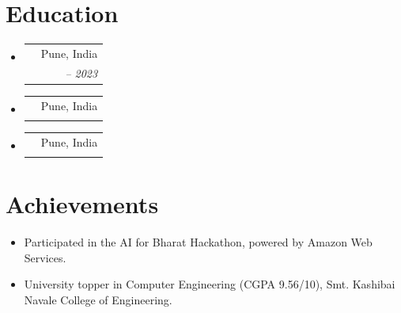 \documentclass[a4paper]{article}
\makeatletter
\newcommand{\garamondmedium}{\fontfamily{EBGaramond-LF}\fontseries{medium}\selectfont}
\newcommand{\body}{\fontsize{9.4pt}{12.6pt}\selectfont}
\newcommand{\meta}{\fontsize{9.4pt}{12.2pt}\selectfont}
\newcommand{\primary}{\fontsize{10.15pt}{12.4pt}\selectfont}
\newcommand{\rolefont}{\garamondmedium\itshape\fontsize{9.75pt}{12pt}\selectfont}
\newcommand{\resumeItem}[1]{\item\body #1}
\newcommand{\resumeSubheading}[4]{%
  \item
  \begin{tabular*}{\textwidth}[t]{@{}>{\RaggedRight\arraybackslash}p{\dimexpr\textwidth-1.85in\relax}@{\extracolsep{\fill}}r@{}}
    {\primary\textbf{#1}} & {\meta #2} \\[-0.5pt]
    {\rolefont #3} & {\rolefont #4} \\
  \end{tabular*}%
}
\newcommand{\resumeSubHeadingListStart}{\begin{itemize}[leftmargin=0in, label={}, topsep=1.5pt, partopsep=0pt, itemsep=5pt, parsep=0pt]}
\newcommand{\resumeSubHeadingListEnd}{\end{itemize}}
\newcommand{\resumeItemListStart}{\begin{itemize}[leftmargin=0.16in, label={\raisebox{0.2ex}{\fontsize{4.6pt}{4.6pt}\selectfont\textbullet}}, itemsep=0.6pt, parsep=0pt, topsep=1.2pt, partopsep=0pt]}
\newcommand{\resumeItemListEnd}{\end{itemize}}
\makeatother
\begin{document}
\section{Education}
\resumeSubHeadingListStart
  \resumeSubheading
    {Smt. Kashibai Navale College of Engineering}{Pune, India}
    {B.E. in Computer Engineering \textnormal{| CGPA: 9.56 / 10}}{2019 – 2023}
  \resumeSubheading
    {Mahatma Gandhi Vidyalaya and Jr. College}{Pune, India}
    {HSC (Class XII) \textnormal{| 77.85\%}}{2019}
  \resumeSubheading
    {Mahatma Gandhi Vidyalaya}{Pune, India}
    {SSC (Class X) \textnormal{| 92.60\%}}{2017}
\resumeSubHeadingListEnd

\section{Achievements}
\resumeItemListStart
  \resumeItem{Participated in the AI for Bharat Hackathon, powered by Amazon Web Services.}
  \resumeItem{University topper in Computer Engineering (CGPA 9.56/10), Smt. Kashibai Navale College of Engineering.}
\resumeItemListEnd
\end{document}
